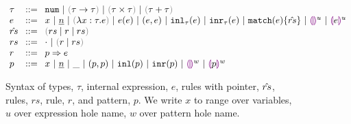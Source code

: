 
\begin{figure}[h]
$\arraycolsep=4pt\begin{array}{lll}
\tau & ::= &
  \tnum ~\vert~
  \tarr{\tau}{\tau} ~\vert~
  \tprod{\tau}{\tau} ~\vert~
  \tsum{\tau}{\tau} \\
e & ::= &
  x ~\vert~
  \hnum{n} ~\vert~
  \hlam{x}{\tau}{e} ~\vert~
  \hap{e}{e} ~\vert~
  \hpair{e}{e} ~\vert~
  \hinl{\tau}{e} ~\vert~
  \hinr{\tau}{e} ~\vert~
  \hmatch{e}{\zrules} ~\vert~
  \hehole{u} ~\vert~
  \hhole{e}{u} \\
\zrules & ::= &
  \zrulsP{rs}{r}{rs} \\
rs & ::= &
  \cdot ~\vert~ \hrulesP{r}{rs} \\
r & ::= &
  \hrul{p}{e} \\
p & ::= &
  x ~\vert~
  \hnum{n} ~\vert~
  \_ ~\vert~
  \hpair{p}{p} ~\vert~
  \hinlp{p} ~\vert~
  \hinrp{p} ~\vert~
  \hehole{w} ~\vert~
  \hhole{p}{w}
\end{array}$
\caption{
  Syntax of types, $\tau$, internal expression, $e$,
  rules with pointer, $\hat{rs}$,
  rules, $rs$,
  rule, $r$, and
  pattern, $p$.
  We write $x$ to range over variables,
  $u$ over expression hole name,
  $w$ over pattern hole name.
}
\label{fig:syntax}
\end{figure}
